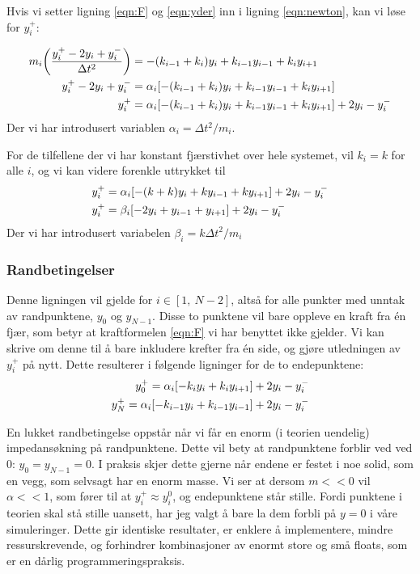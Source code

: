 \documentclass[12p,a4paper]{report}
\begin{document}
Hvis vi setter ligning \ref{eqn:F} og \ref{eqn:yder} inn i ligning \ref{eqn:newton}, kan vi løse for $y_i^+$:

\begin{align*}
m_i\qty(\frac{y_i^+ - 2y_i + y_i^-}{\Delta t^2}) &= -(k_{i-1} + k_i)y_i + k_{i-1}y_{i-1} + k_iy_{i+1}
\\
y_i^+ - 2y_i + y_i^- &= \alpha_i\qty[-(k_{i-1} + k_i)y_i + k_{i-1}y_{i-1} + k_iy_{i+1}]
\\
y_i^+ &= \alpha_i\qty[-(k_{i-1} + k_i)y_i + k_{i-1}y_{i-1} + k_iy_{i+1}] + 2y_i - y_i^-
\end{align*}
Der vi har introdusert variablen $\alpha_i = \Delta t^2/m_i$.

For de tilfellene der vi har konstant fjærstivhet over hele systemet, vil $k_i = k$ for alle $i$, og vi kan videre forenkle uttrykket til
\begin{align*}
y_i^+ &= \alpha_i\qty[-(k + k)y_i + ky_{i-1} + ky_{i+1}] + 2y_i - y_i^- \\
y_i^+ &= \beta_i\qty[-2y_i + y_{i-1} + y_{i+1}] + 2y_i - y_i^-
\end{align*}
Der vi har introdusert variabelen $\beta_i = k \Delta t^2/m_i$

\subsubsection*{Randbetingelser}
Denne ligningen vil gjelde for $i \in [1,\ N-2]$, altså for alle punkter med unntak av randpunktene, $y_0$ og $y_{N-1}$. Disse to punktene vil bare oppleve en kraft fra én fjær, som betyr at kraftformelen \ref{eqn:F} vi har benyttet ikke gjelder. Vi kan skrive om denne til å bare inkludere krefter fra én side, og gjøre utledningen av $y_i^+$ på nytt. Dette resulterer i følgende ligninger for de to endepunktene:
\begin{align*}
y_0^+ = \alpha_i\qty[-k_{i}y_i + k_{i}y_{i+1}] + 2y_i - y_i^-\\
y_N^+ = \alpha_i\qty[-k_{i-1}y_i + k_{i-1}y_{i-1}] + 2y_i - y_i^-
\end{align*}

En lukket randbetingelse oppstår når vi får en enorm (i teorien uendelig) impedansøkning på randpunktene. Dette vil bety at randpunktene forblir ved ved 0: $y_0 = y_{N-1} = 0$. I praksis skjer dette gjerne når endene er festet i noe solid, som en vegg, som selvsagt har en enorm masse. Vi ser at dersom $m<<0$ vil $\alpha << 1$, som fører til at $y_i^+ \approx y_i^0$, og endepunktene står stille. Fordi punktene i teorien skal stå stille uansett, har jeg valgt å bare la dem forbli på $y = 0$ i våre simuleringer. Dette gir identiske resultater, er enklere å implementere, mindre ressurskrevende, og forhindrer kombinasjoner av enormt store og små floats, som er en dårlig programmeringspraksis.
\end{document}
